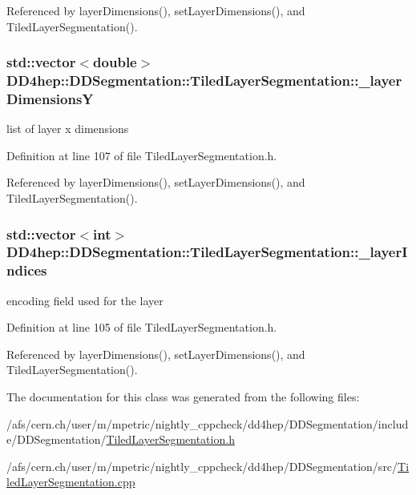 Referenced by layerDimensions(), setLayerDimensions(), and TiledLayerSegmentation().\hypertarget{class_d_d4hep_1_1_d_d_segmentation_1_1_tiled_layer_segmentation_a48d863dc32788c26ddb770d88bb89f96}{
\subsubsection[{\_\-layerDimensionsY}]{\setlength{\rightskip}{0pt plus 5cm}std::vector$<$double$>$ {\bf DD4hep::DDSegmentation::TiledLayerSegmentation::\_\-layerDimensionsY}}}
\label{class_d_d4hep_1_1_d_d_segmentation_1_1_tiled_layer_segmentation_a48d863dc32788c26ddb770d88bb89f96}


list of layer x dimensions 

Definition at line 107 of file TiledLayerSegmentation.h.

Referenced by layerDimensions(), setLayerDimensions(), and TiledLayerSegmentation().\hypertarget{class_d_d4hep_1_1_d_d_segmentation_1_1_tiled_layer_segmentation_a1988abb223b228480310aaf061d9210e}{
\subsubsection[{\_\-layerIndices}]{\setlength{\rightskip}{0pt plus 5cm}std::vector$<$int$>$ {\bf DD4hep::DDSegmentation::TiledLayerSegmentation::\_\-layerIndices}}}
\label{class_d_d4hep_1_1_d_d_segmentation_1_1_tiled_layer_segmentation_a1988abb223b228480310aaf061d9210e}


encoding field used for the layer 

Definition at line 105 of file TiledLayerSegmentation.h.

Referenced by layerDimensions(), setLayerDimensions(), and TiledLayerSegmentation().

The documentation for this class was generated from the following files:\begin{DoxyCompactItemize}
\item 
/afs/cern.ch/user/m/mpetric/nightly\_\-cppcheck/dd4hep/DDSegmentation/include/DDSegmentation/\hyperlink{_tiled_layer_segmentation_8h}{TiledLayerSegmentation.h}\item 
/afs/cern.ch/user/m/mpetric/nightly\_\-cppcheck/dd4hep/DDSegmentation/src/\hyperlink{_tiled_layer_segmentation_8cpp}{TiledLayerSegmentation.cpp}\end{DoxyCompactItemize}
